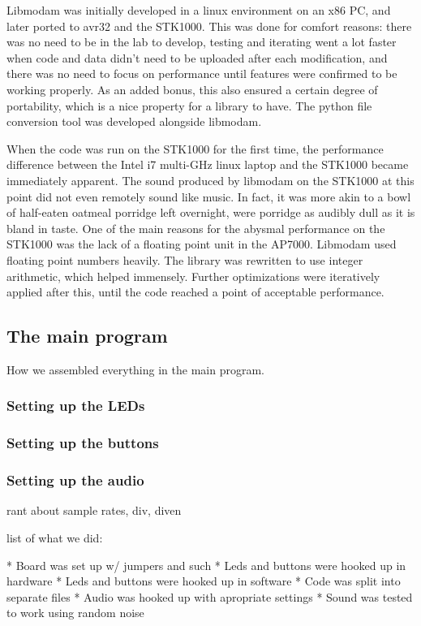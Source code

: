 Libmodam was initially developed in a linux environment on an x86 PC, and later ported to avr32 and the STK1000.
This was done for comfort reasons: there was no need to be in the lab to develop, testing and iterating went a lot faster when code and data didn't need to be uploaded after each modification, and there was no need to focus on performance until features were confirmed to be working properly.
As an added bonus, this also ensured a certain degree of portability, which is a nice property for a library to have.
The python file conversion tool was developed alongside libmodam.

When the code was run on the STK1000 for the first time, the performance difference between the Intel i7 multi-GHz linux laptop and the STK1000 became immediately apparent.
The sound produced by libmodam on the STK1000 at this point did not even remotely sound like music.
In fact, it was more akin to a bowl of half-eaten oatmeal porridge left overnight, were porridge as audibly dull as it is bland in taste.
One of the main reasons for the abysmal performance on the STK1000 was the lack of a floating point unit in the AP7000.
Libmodam used floating point numbers heavily.
The library was rewritten to use integer arithmetic, which helped immensely.
Further optimizations were iteratively applied after this, until the code reached a point of acceptable performance.

\subsection{The main program}

How we assembled everything in the main program.

\subsubsection{Setting up the LEDs}
\subsubsection{Setting up the buttons}
\subsubsection{Setting up the audio}
rant about sample rates, div, diven


list of what we did:

* Board was set up w/ jumpers and such
* Leds and buttons were hooked up in hardware
* Leds and buttons were hooked up in software
* Code was split into separate files
* Audio was hooked up with apropriate settings
* Sound was tested to work using random noise


